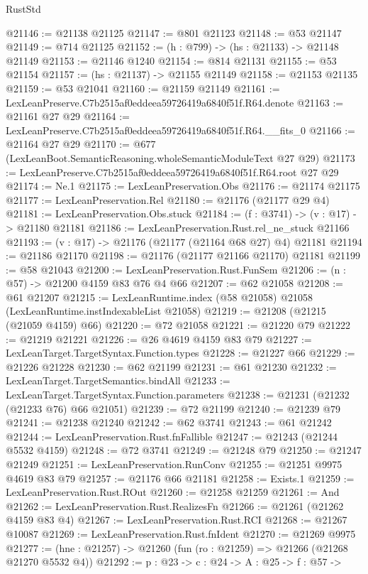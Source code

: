 \begin{lexlean}{RustStd}
\begin{coremodule}
@21146 := @21138 @21125
@21147 := @801 @21123
@21148 := @53 @21147
@21149 := @714 @21125
@21152 := (h : @799) -> (hs : @21133) -> @21148 @21149
@21153 := @21146 @1240
@21154 := @814 @21131
@21155 := @53 @21154
@21157 := (hs : @21137) -> @21155 @21149
@21158 := @21153 @21135
@21159 := @53 @21041
@21160 := @21159 @21149
@21161 := LexLeanPreserve.C7b2515af0eddeea59726419a6840f51f.R64.denote
@21163 := @21161 @27 @29
@21164 := LexLeanPreserve.C7b2515af0eddeea59726419a6840f51f.R64.__fits_0
@21166 := @21164 @27 @29
@21170 := @677 (LexLeanBoot.SemanticReasoning.wholeSemanticModuleText @27 @29)
@21173 := LexLeanPreserve.C7b2515af0eddeea59726419a6840f51f.R64.root @27 @29
@21174 := Ne.{1}
@21175 := LexLeanPreservation.Obs
@21176 := @21174 @21175
@21177 := LexLeanPreservation.Rel
@21180 := @21176 (@21177 @29 @4)
@21181 := LexLeanPreservation.Obs.stuck
@21184 := (f : @3741) -> (v : @17) -> @21180 @21181
@21186 := LexLeanPreservation.Rust.rel_ne_stuck @21166
@21193 := (v : @17) -> @21176 (@21177 (@21164 @68 @27) @4) @21181
@21194 := @21186 @21170
@21198 := @21176 (@21177 @21166 @21170) @21181
@21199 := @58 @21043
@21200 := LexLeanPreservation.Rust.FunSem
@21206 := (n : @57) -> @21200 @4159 @83 @76 @4 @66
@21207 := @62 @21058
@21208 := @61 @21207
@21215 := LexLeanRuntime.index (@58 @21058) @21058 (LexLeanRuntime.instIndexableList @21058)
@21219 := @21208 (@21215 (@21059 @4159) @66)
@21220 := @72 @21058
@21221 := @21220 @79
@21222 := @21219 @21221
@21226 := @26 @4619 @4159 @83 @79
@21227 := LexLeanTarget.TargetSyntax.Function.types
@21228 := @21227 @66
@21229 := @21226 @21228
@21230 := @62 @21199
@21231 := @61 @21230
@21232 := LexLeanTarget.TargetSemantics.bindAll
@21233 := LexLeanTarget.TargetSyntax.Function.parameters
@21238 := @21231 (@21232 (@21233 @76) @66 @21051)
@21239 := @72 @21199
@21240 := @21239 @79
@21241 := @21238 @21240
@21242 := @62 @3741
@21243 := @61 @21242
@21244 := LexLeanPreservation.Rust.fnFallible
@21247 := @21243 (@21244 @5532 @4159)
@21248 := @72 @3741
@21249 := @21248 @79
@21250 := @21247 @21249
@21251 := LexLeanPreservation.RunConv
@21255 := @21251 @9975 @4619 @83 @79
@21257 := @21176 @66 @21181
@21258 := Exists.{1}
@21259 := LexLeanPreservation.Rust.ROut
@21260 := @21258 @21259
@21261 := And
@21262 := LexLeanPreservation.Rust.RealizesFn
@21266 := @21261 (@21262 @4159 @83 @4)
@21267 := LexLeanPreservation.Rust.RCI
@21268 := @21267 @10087
@21269 := LexLeanPreservation.Rust.fnIdent
@21270 := @21269 @9975
@21277 := (hne : @21257) -> @21260 (fun (ro : @21259) => @21266 (@21268 @21270 @5532 @4))
@21292 := {p : @23} ->
  {c : @24} ->
  {A : @25} ->
  {f : @57} ->

\end{coremodule}
\end{lexlean}
